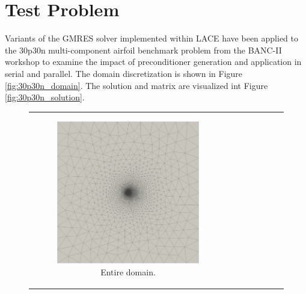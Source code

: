 \documentclass[12pt,portrait]{article}
\begin{document}
\FloatBarrier
\section{Test Problem}

Variants of the GMRES solver implemented within LACE have been applied to the 30p30n 
multi-component airfoil benchmark problem from the BANC-II 
workshop to examine the impact of preconditioner generation and application in serial and parallel.
The domain discretization is shown in Figure \ref{fig:30p30n_domain}.
The solution and matrix are visualized int Figure \ref{fig:30p30n_solution}.

\begin{figure}[ht]\centering
 \begin{tabular}{cc}
 \multirow{2}{*}{
  \begin{subfigure}[!ht]{0.5\textwidth}
        \centering
  \vspace{-60pt}
  \includegraphics[width=\columnwidth]{../images/30p30n_entireDomain.png}
  \caption{Entire domain.}
  \label{fig:30p30n_convergence}
  \end{subfigure}%
  }
   &
    \begin{subfigure}[!ht]{0.5\textwidth}
        \centering
        \vspace{5pt}

\end{subfigure}
\end{tabular}
\end{figure}
\end{document}
